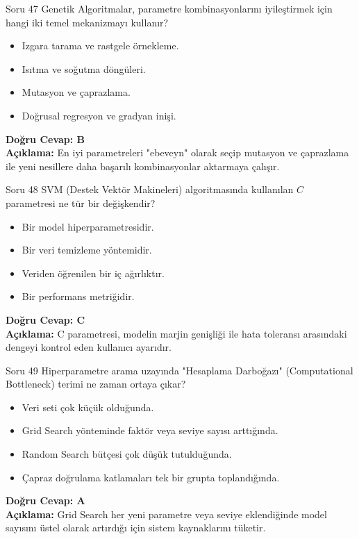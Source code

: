 \documentclass[12pt,a4paper]{article}
\begin{document}
\begin{testcard}{Soru 47}
    Genetik Algoritmalar, parametre kombinasyonlarını iyileştirmek için hangi iki temel mekanizmayı kullanır?
    \begin{itemize}
        \item[A)] Izgara tarama ve rastgele örnekleme.
        \item[B)] Isıtma ve soğutma döngüleri.
        \item[C)] Mutasyon ve çaprazlama.
        \item[D)] Doğrusal regresyon ve gradyan inişi.
    \end{itemize}
    \tcblower
    \textbf{Doğru Cevap: B} \\
    \textbf{Açıklama:} En iyi parametreleri "ebeveyn" olarak seçip mutasyon ve çaprazlama ile yeni nesillere daha başarılı kombinasyonlar aktarmaya çalışır.
\end{testcard}

\begin{testcard}{Soru 48}
    SVM (Destek Vektör Makineleri) algoritmasında kullanılan $C$ parametresi ne tür bir değişkendir?
    \begin{itemize}
        \item[A)] Bir model hiperparametresidir.
        \item[B)] Bir veri temizleme yöntemidir.
        \item[C)] Veriden öğrenilen bir iç ağırlıktır.
        \item[D)] Bir performans metriğidir.
    \end{itemize}
    \tcblower
    \textbf{Doğru Cevap: C} \\
    \textbf{Açıklama:} C parametresi, modelin marjin genişliği ile hata toleransı arasındaki dengeyi kontrol eden kullanıcı ayarıdır.
\end{testcard}

\begin{testcard}{Soru 49}
    Hiperparametre arama uzayında "Hesaplama Darboğazı" (Computational Bottleneck) terimi ne zaman ortaya çıkar?
    \begin{itemize}
        \item[A)] Veri seti çok küçük olduğunda.
        \item[B)] Grid Search yönteminde faktör veya seviye sayısı arttığında.
        \item[C)] Random Search bütçesi çok düşük tutulduğunda.
        \item[D)] Çapraz doğrulama katlamaları tek bir grupta toplandığında.
    \end{itemize}
    \tcblower
    \textbf{Doğru Cevap: A} \\
    \textbf{Açıklama:} Grid Search her yeni parametre veya seviye eklendiğinde model sayısını üstel olarak artırdığı için sistem kaynaklarını tüketir.
\end{testcard}
\end{document}
